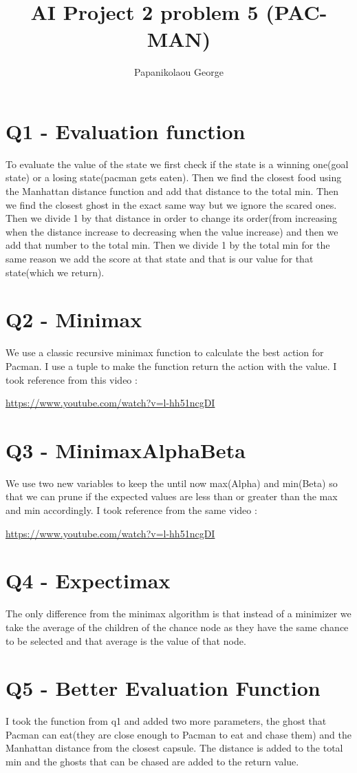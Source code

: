 \documentclass{article}
\title{AI Project 2 problem 5 (PAC-MAN)}
\author{Papanikolaou George}
\begin{document}
\graphicspath{ {./images/} }
\maketitle

\section{Q1 - Evaluation function}
To evaluate the value of the state we first check if the state is a winning one(goal state) or a losing state(pacman gets eaten). Then we find the closest food using the Manhattan distance function and add that distance to the total min. Then we find the closest ghost in the exact same way but we ignore the scared ones. Then we divide 1 by that distance in order to change its order(from increasing when the distance increase to decreasing when the value increase) and then we add that number to the total min. Then we divide 1 by the total min for the same reason we add the score at that state and that is our value for that state(which we return).
\section{Q2 - Minimax}
We use a classic recursive minimax function to calculate the best action for Pacman. I use a tuple to make the function return the action with the value.  I took reference from this video :
\begin{center}
    \url{https://www.youtube.com/watch?v=l-hh51ncgDI}
\end{center}

\section{Q3 - MinimaxAlphaBeta}
We use two new variables to keep the until now max(Alpha) and min(Beta) so that we can prune if the expected values are less than or greater than the max and min accordingly. I took reference from the same video :
\begin{center}
    \url{https://www.youtube.com/watch?v=l-hh51ncgDI}
\end{center}

\section{Q4 - Expectimax}

The only difference from the minimax algorithm is that instead of a minimizer we take the average of the children of the chance node as they have the same chance to be selected and that average is the value of that node. 

\section{Q5 - Better Evaluation Function}

I took the function from q1 and added two more parameters, the ghost that Pacman can eat(they are close enough to Pacman to eat and chase them) and the Manhattan distance from the closest capsule. The distance is added to the total min and the ghosts that can be chased are added to the return value.
\end{document}
